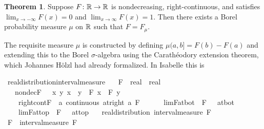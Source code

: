\documentclass[leqno]{article}
\theoremstyle{definition}
\newtheorem{theorem}{Theorem}[section]
\begin{document}
\begin{theorem}
Suppose $F\colon \mathbb{R} \rightarrow \mathbb{R}$ is nondecreasing, right-continuous, and satisfies $\lim_{x \rightarrow -\infty} F(x) = 0$ and $\lim_{x \rightarrow \infty} F(x) = 1$. Then there exists a Borel probability measure $\mu$ on $\mathbb{R}$ such that $F = F_\mu$.
\end{theorem}

The requisite measure $\mu$ is constructed by defining $\mu (a,b] = F(b) - F(a)$ and extending this to the Borel $\sigma$-algebra using the Carath\'eodory extension theorem, which Johannes H\"olzl had already formalized. In Isabelle this is

\newpage

\begin{isabellebody}
\isamarkupfalse%
\ real{\isacharunderscore}distribution{\isacharunderscore}interval{\isacharunderscore}measure{\isacharcolon}\isanewline
\ \ \ F\ {\isacharcolon}{\isacharcolon}\ {\isachardoublequoteopen}real\ {\isasymRightarrow}\ real{\isachardoublequoteclose}\isanewline
\ \ \ nondecF\ {\isacharcolon}\ {\isachardoublequoteopen}{\isasymAnd}\ x\ y{\isachardot}\ x\ {\isasymle}\ y\ {\isasymLongrightarrow}\ F\ x\ {\isasymle}\ F\ y{\isachardoublequoteclose}\ \isanewline
\ \ \ \ right{\isacharunderscore}cont{\isacharunderscore}F\ {\isacharcolon}\ {\isachardoublequoteopen}{\isasymAnd}a{\isachardot}\ continuous\ {\isacharparenleft}at{\isacharunderscore}right\ a{\isacharparenright}\ F{\isachardoublequoteclose}\ \ \isanewline
\ \ \ \ lim{\isacharunderscore}F{\isacharunderscore}at{\isacharunderscore}bot\ {\isacharcolon}\ {\isachardoublequoteopen}{\isacharparenleft}F\ {\isacharminus}{\isacharminus}{\isacharminus}{\isachargreater}\ {}{\isacharparenright}\ at{\isacharunderscore}bot{\isachardoublequoteclose}\ \isanewline
\ \ \ \ lim{\isacharunderscore}F{\isacharunderscore}at{\isacharunderscore}top\ {\isacharcolon}\ {\isachardoublequoteopen}{\isacharparenleft}F\ {\isacharminus}{\isacharminus}{\isacharminus}{\isachargreater}\ {}{\isacharparenright}\ at{\isacharunderscore}top{\isachardoublequoteclose}\isanewline
\ \ \ {\isachardoublequoteopen}real{\isacharunderscore}distribution\ {\isacharparenleft}interval{\isacharunderscore}measure\ F{\isacharparenright}{\isachardoublequoteclose}\isanewline
{}\isamarkupfalse%
\ {\isacharminus}\isanewline
\ \ \isamarkupfalse%
\ {\isacharquery}F\ {\isacharequal}\ {\isachardoublequoteopen}interval{\isacharunderscore}measure\ F{\isachardoublequoteclose}\isanewline

\end{isabellebody}
\end{document}
